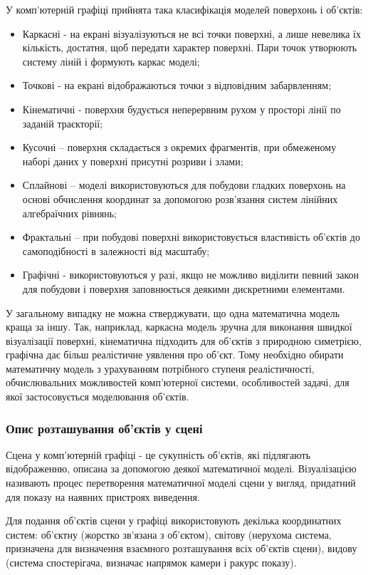 \let\mypdfximage\pdfximage\def\pdfximage{\immediate\mypdfximage}\documentclass[14pt,a4paper]{extarticle}
\theoremstyle{definition}
\renewcommand{\[}{\begin{singlespace}\begin{equation*}}
\renewcommand{\]}{\end{equation*}\end{singlespace}}
\renewcommand{\+}{\discretionary{\mbox{\scriptsize$\hookleftarrow$}}{}{}}
\begin{document}
У комп'ютерній графіці прийнята така класифікація моделей поверхонь і об'єктів:
\begin{itemize}
\item Каркасні - на екрані візуалізуються не всі точки поверхні, а лише невелика їх кількість, достатня, щоб передати характер поверхні. Пари точок утворюють  систему ліній і формують каркас моделі;
\item Точкові - на екрані відображаються точки з відповідним забарвленням;
\item Кінематичні - поверхня будується неперервним рухом у просторі лінії по заданій траєкторії;
\item Кусочні – поверхня складається з окремих фрагментів,  при обмеженому наборі даних у поверхні присутні розриви і злами;
\item Сплайнові – моделі використовуються для побудови гладких поверхонь на основі обчислення координат за допомогою розв'язання систем лінійних алгебраїчних рівнянь;
\item Фрактальні – при побудові поверхні використовується властивість об'єктів до самоподібності в залежності від масштабу;
\item Графічні - використовуються у разі, якщо не можливо виділити певний закон для побудови і поверхня заповнюється деякими дискретними елементами.
\end{itemize}

У загальному випадку не можна стверджувати, що одна математична модель краща за іншу. Так, наприклад, каркасна модель зручна для виконання швидкої візуалізації поверхні, кінематична підходить для  об'єктів з природною симетрією, графічна дає більш реалістичне уявлення про об'єкт.  Тому необхідно обирати математичну модель з урахуванням потрібного ступеня реалістичності, обчислювальних можливостей комп'ютерної системи, особливостей задачі, для якої застосовується моделювання об'єктів.

\subsubsection{Опис розташування об'єктів у сцені}

Сцена у комп'ютерній графіці - це сукупність об'єктів, які підлягають відображенню, описана за допомогою деякої математичної моделі. Візуалізацією називають процес перетворення математичної моделі сцени у вигляд, придатний для показу на наявних пристроях виведення.

Для подання об'єктів сцени у графіці використовують декілька координатних систем: об'єктну (жорстко зв'язана з об'єктом), світову (нерухома система, призначена для визначення взаємного розташування всіх об'єктів сцени), видову (система спостерігача, визначає напрямок камери і ракурс показу).
\end{document}
